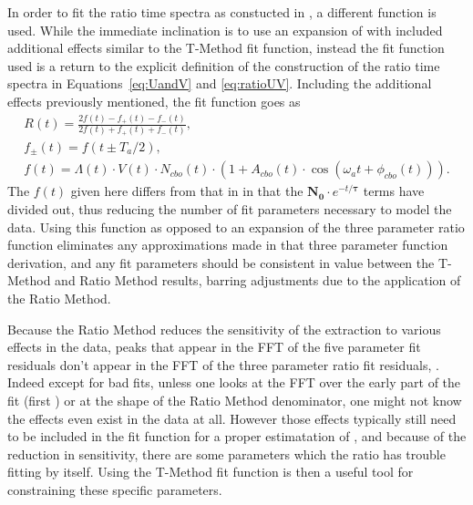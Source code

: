 In order to fit the ratio time spectra as constucted in , a different function is used. While the immediate inclination is to use an expansion of  with included additional effects similar to the T-Method fit function, instead the fit function used is a return to the explicit definition of the construction of the ratio time spectra in Equations~\ref{eq:UandV} and \ref{eq:ratioUV}. Including the additional effects previously mentioned, the fit function goes as
    \begin{gather}
        R(t) = \frac{2f(t) - f_{+}(t) - f_{-}(t)}{2f(t) + f_{+}(t) + f_{-}(t)}, \\
        f_{\pm}(t) = f(t \pm T_{a}/2), \\
        f(t) = \Lambda(t) \cdot V(t) \cdot N_{cbo}(t) \cdot (1 + A_{cbo}(t) \cdot \cos(\omega_{a}t + \phi_{cbo}(t))).
    \label{eq:fullratiofunction}
    \end{gather}
The $f(t)$ given here differs from that in  in that the $\boldsymbol{N_{0}} \cdot e^{-t/\boldsymbol{\tau}}$ terms have divided out, thus reducing the number of fit parameters necessary to model the data. Using this function as opposed to an expansion of the three parameter ratio function eliminates any approximations made in that three parameter function derivation, and any fit parameters should be consistent in value between the T-Method and Ratio Method results, barring adjustments due to the application of the Ratio Method. 

Because the Ratio Method reduces the sensitivity of the \wa extraction to various effects in the data, peaks that appear in the FFT of the five parameter fit residuals don't appear in the FFT of the three parameter ratio fit residuals, . Indeed except for bad fits, unless one looks at the FFT over the early part of the fit (first ) or at the shape of the Ratio Method denominator, one might not know the effects even exist in the data at all. However those effects typically still need to be included in the fit function for a proper estimatation of \wa, and because of the reduction in sensitivity, there are some parameters which the ratio has trouble fitting by itself. Using the T-Method fit function is then a useful tool for constraining these specific parameters.



